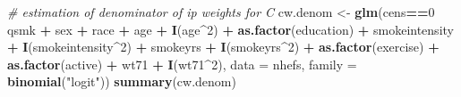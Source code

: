 \documentclass[10pt,]{book}
\newenvironment{Shaded}{\begin{snugshade}}{\end{snugshade}}
\newcommand{\CommentTok}[1]{\textcolor[rgb]{0.56,0.35,0.01}{\textit{#1}}}
\newcommand{\DataTypeTok}[1]{\textcolor[rgb]{0.13,0.29,0.53}{#1}}
\newcommand{\DecValTok}[1]{\textcolor[rgb]{0.00,0.00,0.81}{#1}}
\newcommand{\KeywordTok}[1]{\textcolor[rgb]{0.13,0.29,0.53}{\textbf{#1}}}
\newcommand{\NormalTok}[1]{#1}
\newcommand{\OperatorTok}[1]{\textcolor[rgb]{0.81,0.36,0.00}{\textbf{#1}}}
\newcommand{\StringTok}[1]{\textcolor[rgb]{0.31,0.60,0.02}{#1}}
\begin{document}
\begin{Shaded}
\begin{Highlighting}[]
\CommentTok{# estimation of denominator of ip weights for C}
\NormalTok{cw.denom <-}\StringTok{ }\KeywordTok{glm}\NormalTok{(cens}\OperatorTok{==}\DecValTok{0} \OperatorTok{~}\StringTok{ }\NormalTok{qsmk }\OperatorTok{+}\StringTok{ }\NormalTok{sex }\OperatorTok{+}\StringTok{ }\NormalTok{race }\OperatorTok{+}\StringTok{ }\NormalTok{age }\OperatorTok{+}\StringTok{ }\KeywordTok{I}\NormalTok{(age}\OperatorTok{^}\DecValTok{2}\NormalTok{) }
                     \OperatorTok{+}\StringTok{ }\KeywordTok{as.factor}\NormalTok{(education) }\OperatorTok{+}\StringTok{ }\NormalTok{smokeintensity }\OperatorTok{+}\StringTok{ }\KeywordTok{I}\NormalTok{(smokeintensity}\OperatorTok{^}\DecValTok{2}\NormalTok{) }
                     \OperatorTok{+}\StringTok{ }\NormalTok{smokeyrs }\OperatorTok{+}\StringTok{ }\KeywordTok{I}\NormalTok{(smokeyrs}\OperatorTok{^}\DecValTok{2}\NormalTok{) }\OperatorTok{+}\StringTok{ }\KeywordTok{as.factor}\NormalTok{(exercise) }
                     \OperatorTok{+}\StringTok{ }\KeywordTok{as.factor}\NormalTok{(active) }\OperatorTok{+}\StringTok{ }\NormalTok{wt71 }\OperatorTok{+}\StringTok{ }\KeywordTok{I}\NormalTok{(wt71}\OperatorTok{^}\DecValTok{2}\NormalTok{), }
                     \DataTypeTok{data =}\NormalTok{ nhefs, }\DataTypeTok{family =} \KeywordTok{binomial}\NormalTok{(}\StringTok{"logit"}\NormalTok{))}
\KeywordTok{summary}\NormalTok{(cw.denom)}
\end{Highlighting}
\end{Shaded}
\end{document}
